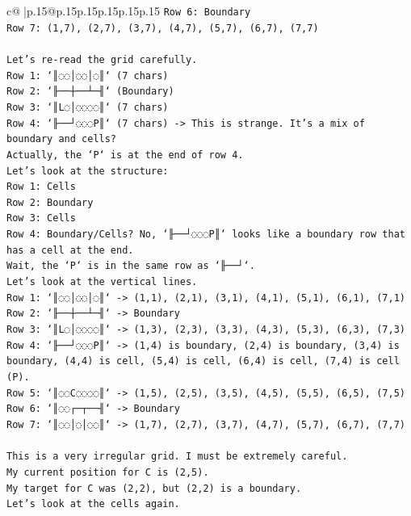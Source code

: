 \documentclass{article}
\begin{document}
{\begin{supertabular}{c@{$\;$}|p{.15\linewidth}@{}p{.15\linewidth}p{.15\linewidth}p{.15\linewidth}p{.15\linewidth}p{.15\linewidth}}
{{{\texttt{Row 6: Boundary} \\
\texttt{Row 7: (1,7), (2,7), (3,7), (4,7), (5,7), (6,7), (7,7)} \\
\\ 
\texttt{Let's re{-}read the grid carefully.} \\
\texttt{Row 1: `║◌◌│◌◌│◌║` (7 chars)} \\
\texttt{Row 2: `╟──┼──┴─╢` (Boundary)} \\
\texttt{Row 3: `║L◌│◌◌◌◌║` (7 chars)} \\
\texttt{Row 4: `╟──┘◌◌◌P║` (7 chars) {-}> This is strange. It's a mix of boundary and cells?} \\
\texttt{Actually, the `P` is at the end of row 4.} \\
\texttt{Let's look at the structure:} \\
\texttt{Row 1: Cells} \\
\texttt{Row 2: Boundary} \\
\texttt{Row 3: Cells} \\
\texttt{Row 4: Boundary/Cells? No, `╟──┘◌◌◌P║` looks like a boundary row that has a cell at the end.} \\
\texttt{Wait, the `P` is in the same row as `╟──┘`.} \\
\texttt{Let's look at the vertical lines.} \\
\texttt{Row 1: `║◌◌│◌◌│◌║` {-}> (1,1), (2,1), (3,1), (4,1), (5,1), (6,1), (7,1)} \\
\texttt{Row 2: `╟──┼──┴─╢` {-}> Boundary} \\
\texttt{Row 3: `║L◌│◌◌◌◌║` {-}> (1,3), (2,3), (3,3), (4,3), (5,3), (6,3), (7,3)} \\
\texttt{Row 4: `╟──┘◌◌◌P║` {-}> (1,4) is boundary, (2,4) is boundary, (3,4) is boundary, (4,4) is cell, (5,4) is cell, (6,4) is cell, (7,4) is cell (P).} \\
\texttt{Row 5: `║◌◌C◌◌◌◌║` {-}> (1,5), (2,5), (3,5), (4,5), (5,5), (6,5), (7,5)} \\
\texttt{Row 6: `║◌◌┌─┬──╢` {-}> Boundary} \\
\texttt{Row 7: `║◌◌│◌│◌◌║` {-}> (1,7), (2,7), (3,7), (4,7), (5,7), (6,7), (7,7)} \\
\\ 
\texttt{This is a very irregular grid. I must be extremely careful.} \\
\texttt{My current position for C is (2,5).} \\
\texttt{My target for C was (2,2), but (2,2) is a boundary.} \\
\texttt{Let's look at the cells again.} \\
}}}
\end{supertabular}}
\end{document}
